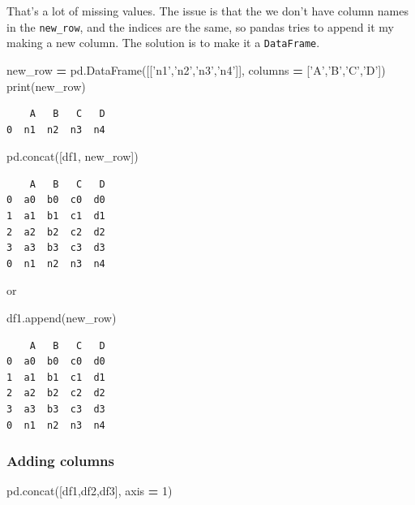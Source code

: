 \documentclass[
  letterpaper,
]{scrbook}
\newenvironment{Shaded}{\begin{snugshade}}{\end{snugshade}}
\newcommand{\BuiltInTok}[1]{#1}
\newcommand{\DecValTok}[1]{\textcolor[rgb]{0.00,0.00,0.81}{#1}}
\newcommand{\NormalTok}[1]{#1}
\newcommand{\OperatorTok}[1]{\textcolor[rgb]{0.81,0.36,0.00}{\textbf{#1}}}
\newcommand{\StringTok}[1]{\textcolor[rgb]{0.31,0.60,0.02}{#1}}
\begin{document}
That's a lot of missing values. The issue is that the we don't have column names in the \texttt{new\_row}, and the indices are the same, so pandas tries to append it my making a new column. The solution is to make it a \texttt{DataFrame}.

\begin{Shaded}
\begin{Highlighting}[]
\NormalTok{new_row }\OperatorTok{=}\NormalTok{ pd.DataFrame([[}\StringTok{'n1'}\NormalTok{,}\StringTok{'n2'}\NormalTok{,}\StringTok{'n3'}\NormalTok{,}\StringTok{'n4'}\NormalTok{]], columns }\OperatorTok{=}\NormalTok{ [}\StringTok{'A'}\NormalTok{,}\StringTok{'B'}\NormalTok{,}\StringTok{'C'}\NormalTok{,}\StringTok{'D'}\NormalTok{])}
\BuiltInTok{print}\NormalTok{(new_row)}
\end{Highlighting}
\end{Shaded}

\begin{verbatim}
    A   B   C   D
0  n1  n2  n3  n4
\end{verbatim}

\begin{Shaded}
\begin{Highlighting}[]
\NormalTok{pd.concat([df1, new_row])}
\end{Highlighting}
\end{Shaded}

\begin{verbatim}
    A   B   C   D
0  a0  b0  c0  d0
1  a1  b1  c1  d1
2  a2  b2  c2  d2
3  a3  b3  c3  d3
0  n1  n2  n3  n4
\end{verbatim}

or

\begin{Shaded}
\begin{Highlighting}[]
\NormalTok{df1.append(new_row)}
\end{Highlighting}
\end{Shaded}

\begin{verbatim}
    A   B   C   D
0  a0  b0  c0  d0
1  a1  b1  c1  d1
2  a2  b2  c2  d2
3  a3  b3  c3  d3
0  n1  n2  n3  n4
\end{verbatim}

\hypertarget{adding-columns}{%
\subsubsection{Adding columns}\label{adding-columns}}

\begin{Shaded}
\begin{Highlighting}[]
\NormalTok{pd.concat([df1,df2,df3], axis }\OperatorTok{=} \DecValTok{1}\NormalTok{)}
\end{Highlighting}
\end{Shaded}
\end{document}
